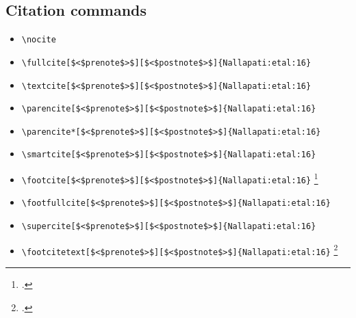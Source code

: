 \subsection{Citation commands}

\begin{itemize}
\item \verb=\nocite= \nocite{VanValin:05} \nocite{Abney:87} \nocite{Bach:80,Bach:81} \nocite{Zwicky:93} \nocite{Haagsma:etal:19-casting} \nocite{Corbett:etal:eds:93-heads} \nocite{Mueller:20-grammatical} \nocite{Nallapati:etal:16} \nocite{Penn:99-optimized} \nocite{McConnel:97-PC-PATR}
\item \verb=\fullcite[$<$prenote$>$][$<$postnote$>$]{Nallapati:etal:16}= \newline  {}
\item \verb=\textcite[$<$prenote$>$][$<$postnote$>$]{Nallapati:etal:16}= \newline \textcite[$<$prenote$>$][$<$postnote$>$]{Nallapati:etal:16}
\item \verb=\parencite[$<$prenote$>$][$<$postnote$>$]{Nallapati:etal:16}= \newline \parencite[$<$prenote$>$][$<$postnote$>$]{Nallapati:etal:16}
\item \verb=\parencite*[$<$prenote$>$][$<$postnote$>$]{Nallapati:etal:16}= \newline \parencite*[$<$prenote$>$][$<$postnote$>$]{Nallapati:etal:16}
\item \verb=\smartcite[$<$prenote$>$][$<$postnote$>$]{Nallapati:etal:16}= \newline \smartcite[$<$prenote$>$][$<$postnote$>$]{Nallapati:etal:16}
\item \verb=\footcite[$<$prenote$>$][$<$postnote$>$]{Nallapati:etal:16}= \newline \footcite[$<$prenote$>$][$<$postnote$>$]{Nallapati:etal:16}
\item \verb=\footfullcite[$<$prenote$>$][$<$postnote$>$]{Nallapati:etal:16}= \newline  {}
\item \verb=\supercite[$<$prenote$>$][$<$postnote$>$]{Nallapati:etal:16}= \newline \supercite[$<$prenote$>$][$<$postnote$>$]{Nallapati:etal:16}
\item \verb=\footcitetext[$<$prenote$>$][$<$postnote$>$]{Nallapati:etal:16}= \newline \footcitetext[$<$prenote$>$][$<$postnote$>$]{Nallapati:etal:16}

\end{itemize}
